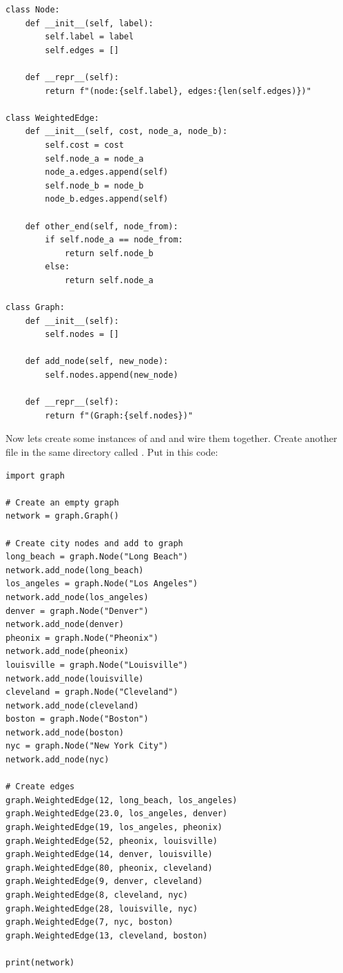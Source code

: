 \begin{verbatim}
class Node:
    def __init__(self, label):
        self.label = label
        self.edges = []

    def __repr__(self):
        return f"(node:{self.label}, edges:{len(self.edges)})"

class WeightedEdge:
    def __init__(self, cost, node_a, node_b):
        self.cost = cost
        self.node_a = node_a
        node_a.edges.append(self)
        self.node_b = node_b
        node_b.edges.append(self)

    def other_end(self, node_from):
        if self.node_a == node_from:
            return self.node_b
        else:
            return self.node_a

class Graph:
    def __init__(self):
        self.nodes = []

    def add_node(self, new_node):
        self.nodes.append(new_node)

    def __repr__(self):
        return f"(Graph:{self.nodes})"
\end{verbatim}

Now lets create some instances of  and
 and wire them together.  Create another file in
the same directory called . Put in this code:

\begin{verbatim}
import graph

# Create an empty graph
network = graph.Graph()

# Create city nodes and add to graph
long_beach = graph.Node("Long Beach")
network.add_node(long_beach)
los_angeles = graph.Node("Los Angeles")
network.add_node(los_angeles)
denver = graph.Node("Denver")
network.add_node(denver)
pheonix = graph.Node("Pheonix")
network.add_node(pheonix)
louisville = graph.Node("Louisville")
network.add_node(louisville)
cleveland = graph.Node("Cleveland")
network.add_node(cleveland)
boston = graph.Node("Boston")
network.add_node(boston)
nyc = graph.Node("New York City")
network.add_node(nyc)

# Create edges
graph.WeightedEdge(12, long_beach, los_angeles)
graph.WeightedEdge(23.0, los_angeles, denver)
graph.WeightedEdge(19, los_angeles, pheonix)
graph.WeightedEdge(52, pheonix, louisville)
graph.WeightedEdge(14, denver, louisville)
graph.WeightedEdge(80, pheonix, cleveland)
graph.WeightedEdge(9, denver, cleveland)
graph.WeightedEdge(8, cleveland, nyc)
graph.WeightedEdge(28, louisville, nyc)
graph.WeightedEdge(7, nyc, boston)
graph.WeightedEdge(13, cleveland, boston)

print(network)
\end{verbatim}

